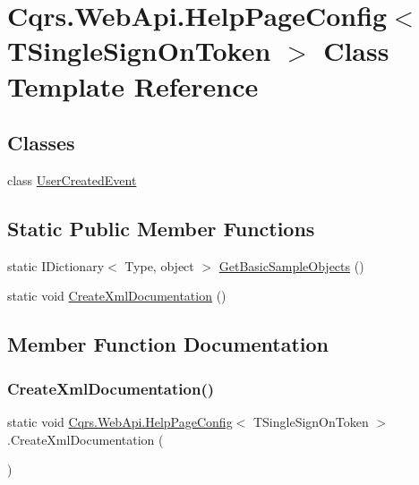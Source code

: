 \hypertarget{classCqrs_1_1WebApi_1_1HelpPageConfig}{}\section{Cqrs.\+Web\+Api.\+Help\+Page\+Config$<$ T\+Single\+Sign\+On\+Token $>$ Class Template Reference}
\label{classCqrs_1_1WebApi_1_1HelpPageConfig}
\subsection*{Classes}
\begin{DoxyCompactItemize}
\item 
class \hyperlink{classCqrs_1_1WebApi_1_1HelpPageConfig_1_1UserCreatedEvent}{User\+Created\+Event}
\end{DoxyCompactItemize}
\subsection*{Static Public Member Functions}
\begin{DoxyCompactItemize}
\item 
static I\+Dictionary$<$ Type, object $>$ \hyperlink{classCqrs_1_1WebApi_1_1HelpPageConfig_a9bbf87bfdedcdebf58a8cbb3f40e004a}{Get\+Basic\+Sample\+Objects} ()
\item 
static void \hyperlink{classCqrs_1_1WebApi_1_1HelpPageConfig_a56b93cb4675afc645d9368b9afeeac27}{Create\+Xml\+Documentation} ()
\end{DoxyCompactItemize}


\subsection{Member Function Documentation}
\mbox{\label{classCqrs_1_1WebApi_1_1HelpPageConfig_a56b93cb4675afc645d9368b9afeeac27}} 
\subsubsection{\texorpdfstring{Create\+Xml\+Documentation()}{CreateXmlDocumentation()}}
{\footnotesize\ttfamily static void \hyperlink{classCqrs_1_1WebApi_1_1HelpPageConfig}{Cqrs.\+Web\+Api.\+Help\+Page\+Config}$<$ T\+Single\+Sign\+On\+Token $>$.Create\+Xml\+Documentation (\begin{DoxyParamCaption}{ }\end{DoxyParamCaption})\hspace{0.3cm}{\ttfamily [static]}}


